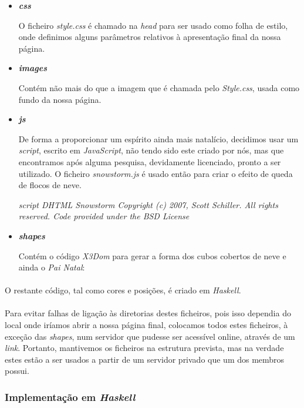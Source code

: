 \documentclass[a4paper,12pt]{article}
\begin{document}
\begin{itemize}
\item {\emph{\textbf{css}}}

O ficheiro \emph{style.css} é chamado na \emph{head} para ser usado como folha de estilo, onde definimos alguns parâmetros relativos à apresentação final da nossa página.

\item {\emph{\textbf{images}}}

Contém não mais do que a imagem que é chamada pelo \emph{Style.css}, usada como fundo da nossa página.

\item {\emph{\textbf{js}}}

De forma a proporcionar um espírito ainda mais natalício, decidimos usar um \emph{script}, escrito em \emph{JavaScript}, não tendo sido este criado por nós, mas que encontramos após alguma pesquisa, devidamente licenciado, pronto a ser utilizado.
O ficheiro \emph{snowstorm.js} é usado então para criar o efeito de queda de flocos de neve.

\emph{script DHTML Snowstorm Copyright (c) 2007, Scott Schiller. All rights reserved. Code provided under the BSD License}

\item {\emph{\textbf{shapes}}}

Contém o código \emph{X3Dom} para gerar a forma dos cubos cobertos de neve e ainda o \emph{Pai Natal}:
\end{itemize}
\paragraph{}
O restante código, tal como cores e posições, é criado em \emph{Haskell}.

\paragraph{}
Para evitar falhas de ligação às diretorias destes ficheiros, pois isso dependia do local onde iríamos abrir a nossa página final, colocamos todos estes ficheiros, à exceção das \emph{shapes}, num servidor que pudesse ser acessível online, através de um \emph{link}. Portanto, mantivemos os ficheiros na estrutura prevista, mas na verdade estes estão a ser usados a partir de um servidor privado que um dos membros possui.

\subsubsection{Implementação em \emph{Haskell}}
\end{document}
